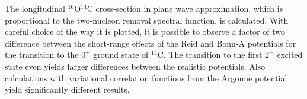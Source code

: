 \begin{WTabstract}%
The longitudinal $^{16}$O\eepp$^{14}$C 
cross-section in plane wave approximation, which is 
proportional to the two-nucleon removal spectral function, is calculated. 
With careful choice of the way it is plotted, it is possible to observe a 
factor 
of two difference between the short-range effects of the Reid and Bonn-A 
potentials for the transition to the $0^+$ ground state of $^{14}$C. 
The transition to the 
first $2^+$ excited state even yields larger differences between the 
realistic potentials.
Also calculations with variational correlation functions from the Argonne 
potential yield significantly different results.
\end{WTabstract}
